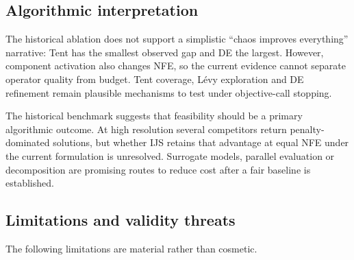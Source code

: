 \documentclass[preprint,12pt]{elsarticle}
\begin{document}
\subsection{Algorithmic interpretation}

The historical ablation does not support a simplistic ``chaos improves everything'' narrative: Tent has the smallest observed gap and DE the largest. However, component activation also changes NFE, so the current evidence cannot separate operator quality from budget. Tent coverage, L\'evy exploration and DE refinement remain plausible mechanisms to test under objective-call stopping.

The historical benchmark suggests that feasibility should be a primary algorithmic outcome. At high resolution several competitors return penalty-dominated solutions, but whether IJS retains that advantage at equal NFE under the current formulation is unresolved. Surrogate models, parallel evaluation or decomposition are promising routes to reduce cost after a fair baseline is established.

\subsection{Limitations and validity threats}\label{sec:limitations}

The following limitations are material rather than cosmetic.
\end{document}
